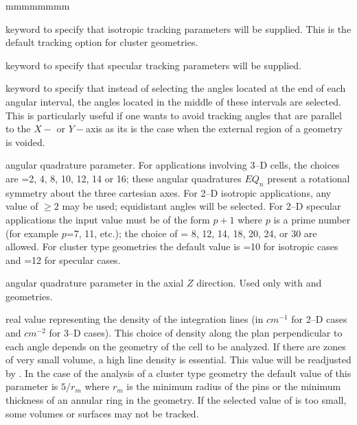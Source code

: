 \begin{ListeDeDescription}{mmmmmmmm}
\item[\moc{TISO}] keyword to specify that isotropic tracking parameters will
be supplied. This is the default tracking option for cluster geometries.


\item[\moc{TSPC}] keyword to specify that specular tracking parameters will be
supplied.

\item[\moc{MEDI}] keyword to specify that instead of selecting the angles
located at the end of each angular interval, the angles located in the middle of
these intervals are selected. This is particularly useful if one wants to avoid
tracking angles that are parallel to the $X-$ or $Y-$axis as its is the case
when the external region of a  geometry is voided.

\item[\dusa{nangl}] angular quadrature parameter. For applications involving
3--D cells, the choices are  =2, 4, 8, 10, 12, 14 or 16; these
angular quadratures  $EQ_{n}$ present a rotational symmetry about the three
cartesian axes. For 2--D isotropic  applications, any value of   $\ge 2$ may
be used; equidistant angles will be selected. For 2--D specular applications the
input value must be of the form $p+1$ where $p$ is a prime number (for example
$p$=7, 11, etc.); the choice of  = 8, 12, 14, 18, 20, 24, or 30 are
allowed. For cluster type geometries the default value is =10 for
isotropic cases and =12 for specular cases.

\item[\dusa{nangl\_z}] angular quadrature parameter in the axial $Z$ direction. Used only
with  and  geometries.

\item[\dusa{dens}] real value representing the density of the integration
lines (in $cm^{-1}$ for 2--D cases and $cm^{-2}$ for 3--D cases). This choice of
density along the plan perpendicular to each angle depends on the geometry of
the cell to be analyzed. If there are zones of very small volume, a high line
density is essential. This value will be readjusted by . In the case
of the analysis of a cluster type geometry the default value of this parameter
is $5/r_{m}$ where $r_{m}$ is the minimum radius of the pins or the
minimum thickness of an annular ring in the geometry. If the selected value of 
is too small, some volumes or surfaces may not be tracked.


\end{ListeDeDescription}
